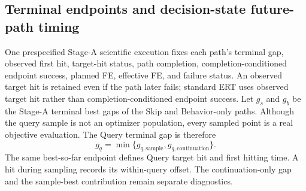 \subsection{Terminal endpoints and decision-state future-path timing}

One prespecified Stage-A scientific execution fixes each path's terminal gap,
observed first hit, target-hit status, path completion,
completion-conditioned endpoint success, planned FE, effective FE, and failure
status.  An observed target hit is retained even if the path later fails;
standard ERT uses observed target hit rather than completion-conditioned
endpoint success.  Let $g_s$ and
$g_b$ be the Stage-A terminal best gaps of the Skip and Behavior-only paths.
Although the query sample is not an optimizer population, every sampled
point is a real objective evaluation.  The Query terminal gap is therefore
\begin{equation}
  g_q=\min\{g_{q,\mathrm{sample}},g_{q,\mathrm{continuation}}\}.
  \label{eq:query-path-gap}
\end{equation}
The same best-so-far endpoint defines Query target hit and first hitting time.  A
hit during sampling records its within-query offset.  The continuation-only gap
and the sample-best contribution remain separate diagnostics.

